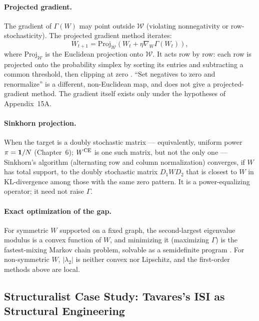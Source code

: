 \documentclass[../structural_economics_book.tex]{subfiles}
\begin{document}
\paragraph{Projected gradient.} The gradient of $\Gamma(W)$ may point outside $\mathcal{W}$ (violating nonnegativity or row-stochasticity). The projected gradient method iterates:
\begin{equation}
W_{t+1} = \text{Proj}_{\mathcal{W}}\left(W_t + \eta \nabla_W \Gamma(W_t)\right),
\end{equation}
where $\text{Proj}_{\mathcal{W}}$ is the Euclidean projection onto $\mathcal{W}$. It acts row by row: each row is projected onto the probability simplex by sorting its entries and subtracting a common threshold, then clipping at zero \citep{duchi2008efficient}. ``Set negatives to zero and renormalize'' is a different, non-Euclidean map, and does not give a projected-gradient method. The gradient itself exists only under the hypotheses of Appendix~15A.

\paragraph{Sinkhorn projection.} When the target is a doubly stochastic matrix --- equivalently, uniform power $\pi = \mathbf{1}/N$ (Chapter~6); $W^{\text{CE}}$ is one such matrix, but not the only one --- Sinkhorn's algorithm (alternating row and column normalization) converges, if $W$ has total support, to the doubly stochastic matrix $D_1WD_2$ that is closest to $W$ in KL-divergence among those with the same zero pattern. It is a power-equalizing operator; it need not raise $\Gamma$.

\paragraph{Exact optimization of the gap.} For symmetric $W$ supported on a fixed graph, the second-largest eigenvalue modulus is a convex function of $W$, and minimizing it (maximizing $\Gamma$) is the fastest-mixing Markov chain problem, solvable as a semidefinite program \citep*{boyd2004fastest}. For non-symmetric $W$, $|\lambda_2|$ is neither convex nor Lipschitz, and the first-order methods above are local.


\subsection*{Structuralist Case Study: Tavares's ISI as Structural Engineering}
\end{document}
